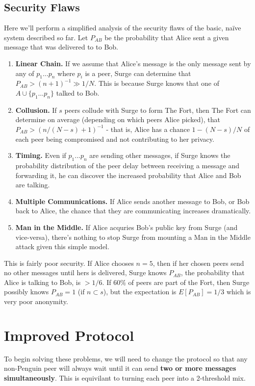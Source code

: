 \documentclass[twocolumn,11pt,english]{article}
\begin{document}
\subsection{Security Flaws}
Here we'll perform a simplified analysis of the security flaws of the basic, na\"ive system described so far. 
Let $P_{AB}$ be the probability that Alice sent a given message that was delivered to to Bob. 
\begin{enumerate}
\item\textbf{Linear Chain.} If we assume that Alice's message is the only message sent by any of $p_1 \ldots p_n$ where $p_i$ is a peer, Surge can determine that $P_{AB} > (n+1)^{-1} \gg 1/N$. This is because Surge knows that one of $A \cup \{p_1 \ldots p_n\}$ talked to Bob.
\item\textbf{Collusion.} If $s$ peers collude with Surge to form The Fort, then The Fort can determine on average (depending on which peers Alice picked), that $P_{AB} > (n/(N-s)+1)^{-1}$ - that is, Alice has a chance $1 - (N-s)/N$ of each peer being compromised and not contributing to her privacy.
\item\textbf{Timing.} Even if $p_1 ... p_n$ are sending other messages, if Surge knows the probability distribution of the peer delay between receiving a message and forwarding it, he can discover the increased probability that Alice and Bob are talking. 
\item\textbf{Multiple Communications.} If Alice sends another message to Bob, or Bob back to Alice, the chance that they are communicating increases dramatically. 
\item\textbf{Man in the Middle.} If Alice acquries Bob's public key from Surge (and vice-versa), there's nothing to stop Surge from mounting a Man in the Middle attack given this simple model. 
\end{enumerate}
This is fairly poor security. If Alice chooses $n = 5$, then if her chosen peers send no other messages until hers is delivered, Surge knows $P_{AB}$, the probability that Alice is talking to Bob, is $> 1/6$. If $60\%$ of peers are part of the Fort, then Surge possibly knows $P_{AB} = 1$ (if $n \subset s$), but the expectation is $E[P_{AB}] = 1/3$ which is very poor anonymity.

\section{Improved Protocol}
To begin solving these problems, we will need to change the protocol so that any non-Penguin peer will always wait until it can send \textbf{two or more messages simultaneously}. This is equivilant to turning each peer into a 2-threshold mix. \cite{trickle02}
\end{document}
